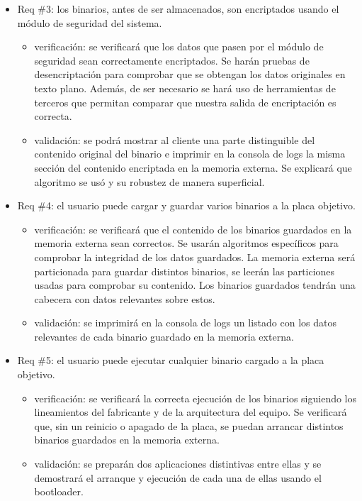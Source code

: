 \documentclass[
11pt, %
]{charter}
\begin{document}
\begin{itemize} 
\item Req \#3: los binarios, antes de ser almacenados, son encriptados usando el módulo de seguridad del sistema.

\begin{itemize}
	\item verificación: se verificará que los datos que pasen por el módulo de seguridad sean correctamente encriptados. Se harán pruebas de desencriptación para comprobar que se obtengan los datos originales en texto plano. Además, de ser necesario se hará uso de herramientas de terceros que permitan comparar que nuestra salida de encriptación es correcta. 
	\item validación: se podrá mostrar al cliente una parte distinguible del contenido original del binario e imprimir en la consola de logs la misma sección del contenido encriptada en la memoria externa. Se explicará que algoritmo se usó y su robustez de manera superficial.
\end{itemize}

\end{itemize}

\begin{itemize} 
\item Req \#4: el usuario puede cargar y guardar varios binarios a la placa objetivo.

\begin{itemize}
	\item verificación: se verificará que el contenido de los binarios guardados en la memoria externa sean correctos. Se usarán algoritmos específicos para comprobar la integridad de los datos guardados. La memoria externa será particionada para guardar distintos binarios, se leerán las particiones usadas para comprobar su contenido. Los binarios guardados tendrán una cabecera con datos relevantes sobre estos. 
	\item validación: se imprimirá en la consola de logs un listado con los datos relevantes de cada binario guardado en la memoria externa.
\end{itemize}

\end{itemize}

\newpage

\begin{itemize} 
\item Req \#5: el usuario puede ejecutar cualquier binario cargado a la placa objetivo.

\begin{itemize}
	\item verificación: se verificará la correcta ejecución de los binarios siguiendo los lineamientos del fabricante y de la arquitectura del equipo. Se verificará que, sin un reinicio o apagado de la placa, se puedan arrancar distintos binarios guardados en la memoria externa. 
	\item validación: se preparán dos aplicaciones distintivas entre ellas y se demostrará el arranque y ejecución de cada una de ellas usando el bootloader.
\end{itemize}

\end{itemize}
\end{document}
